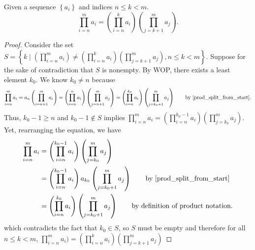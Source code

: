 \begin{lemma}\label{prod_split_from_middle}
    Given a sequence $\left\{ a_i \right\}$ and indices $n\leq k< m$.
    \begin{equation*}
        \prod_{i=n}^m a_i=\left(\prod_{i=n}^{k} a_i\right) \left(\prod_{j=k+1}^m a_j\right).
    \end{equation*}
\end{lemma}
\begin{proof}
    Consider the set $S=\left\{ k\mid (\prod_{i=n}^m a_i) \neq \left(\prod_{i=n}^{k} a_i\right) \left(\prod_{j=k+1}^m a_j\right), n\leq k<m \right\}$. Suppose for the sake of contradiction that $S$ is nonempty. By WOP, there exists a least element $k_0$. We know $k_0\neq n$ because
    \begin{equation*}
            \prod_{i=n}^m a_i=a_n \left( \prod_{i=n+1}^m a_i \right) 
            = \left( \prod_{i=n}^n a_i \right) \left( \prod_{j=n+1}^m a_j \right)=\left( \prod_{i=n}^{k_0} a_i\right) \left(\prod_{j=k_0+1}^m a_j\right) \qquad \text{by \Cref{prod_split_from_start}}.
    \end{equation*}
    Thus, $k_0-1\geq n$ and $k_0-1\notin S$ implies $\prod_{i=n}^m a_i = \left(\prod_{i=n}^{k_0-1} a_i\right)\left(\prod_{j=k_0}^m a_j\right)$. Yet, rearranging the equation, we have
    \begin{equation*}
        \begin{aligned}
            \prod_{i=n}^m a_i&=\left(\prod_{i=n}^{k_0-1} a_i\right)\left(\prod_{j=k_0}^m a_j\right)\\
            &=\left(\prod_{i=n}^{k_0-1} a_i\right)a_{k_0}\left(\prod_{j=k_0+1}^m a_j\right) \qquad \text{by \Cref{prod_split_from_start}}\\
            &=\left(\prod_{i=n}^{k_0} a_i\right)\left(\prod_{j=k_0+1}^m a_j\right) \qquad \text{by definition of product notation.}
        \end{aligned}
    \end{equation*}
    which contradicts the fact that $k_0\in S$, so $S$ must be empty and therefore for all $n\leq k<m$, $\prod_{i=n}^m a_i) = \left(\prod_{i=n}^{k} a_i\right) \left(\prod_{j=k+1}^m a_j\right)$
\end{proof}

